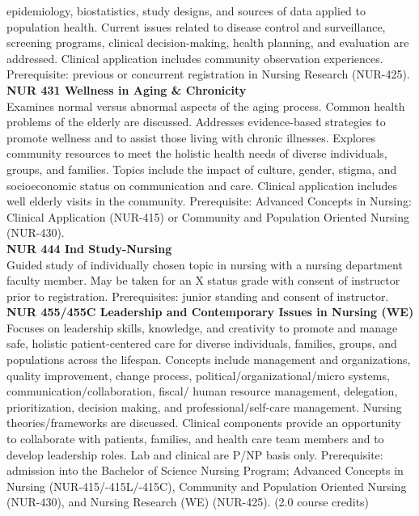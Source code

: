 \documentclass[
  letterpaper,
]{scrbook}
\begin{document}
epidemiology, biostatistics, study designs, and sources of data applied
to population health. Current issues related to disease control and
surveillance, screening programs, clinical decision-making, health
planning, and evaluation are addressed. Clinical application includes
community observation experiences. Prerequisite: previous or concurrent
registration in Nursing Research (NUR-425).\\
\textbf{NUR 431 Wellness in Aging \& Chronicity}\\
Examines normal versus abnormal aspects of the aging process. Common
health problems of the elderly are discussed. Addresses evidence-based
strategies to promote wellness and to assist those living with chronic
illnesses. Explores community resources to meet the holistic health
needs of diverse individuals, groups, and families. Topics include the
impact of culture, gender, stigma, and socioeconomic status on
communication and care. Clinical application includes well elderly
visits in the community. Prerequisite: Advanced Concepts in Nursing:
Clinical Application (NUR-415) or Community and Population Oriented
Nursing (NUR-430).\\
\textbf{NUR 444 Ind Study-Nursing}\\
Guided study of individually chosen topic in nursing with a nursing
department faculty member. May be taken for an X status grade with
consent of instructor prior to registration. Prerequisites: junior
standing and consent of instructor.\\
\textbf{NUR 455/455C Leadership and Contemporary Issues in Nursing
(WE)}\\
Focuses on leadership skills, knowledge, and creativity to promote and
manage safe, holistic patient-centered care for diverse individuals,
families, groups, and populations across the lifespan. Concepts include
management and organizations, quality improvement, change process,
political/organizational/micro systems, communication/collaboration,
fiscal/ human resource management, delegation, prioritization, decision
making, and professional/self-care management. Nursing
theories/frameworks are discussed. Clinical components provide an
opportunity to collaborate with patients, families, and health care team
members and to develop leadership roles. Lab and clinical are P/NP basis
only. Prerequisite: admission into the Bachelor of Science Nursing
Program; Advanced Concepts in Nursing (NUR-415/-415L/-415C), Community
and Population Oriented Nursing (NUR-430), and Nursing Research (WE)
(NUR-425). (2.0 course credits)\\
\end{document}
